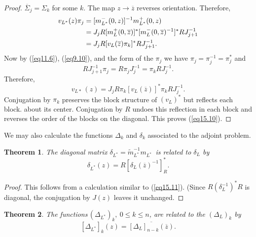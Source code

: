\documentclass{surv-l}
\theoremstyle{plain}
\newtheorem{theorem}{Theorem}[section]
\theoremstyle{definition}
\numberwithin{equation}{chapter}
\begin{document}
\begin{proof}
$\overline{\Sigma}_{j}=\Sigma_{k}$ for some $k$. The map $z\rightarrow\overline{z}$ reverses orientation. Therefore,
\begin{align}\label{eq15.11}
v_{L^{*}}(z)\pi_{j}&=[m_{L^{*}}^{-}(0, z)]^{-1}m_{L^{*}}^{+}(0,z)\\ \notag
&=J_{j}R[m_{L}^{+}(0,\overline{z})]^{*}[m_{L}^{-}(0, \overline{z})^{-1}]^{*}RJ_{j+1}^{-1}\\
&=J_{j}R[v_{L}(\overline{z})\pi_{k}]^{*}RJ_{j+1}^{-1}. \notag
\end{align}
Now by (\ref{eq11.6}), (\ref{eq9.10}), and the form of the $\pi_{j}$ we have $\pi_{j}=\pi_{j}^{-1}=\pi_{j}^{*}$ and
\begin{equation*}
RJ_{j+1}^{-1}\pi_{j}=R\pi_{j}J_{j}^{-1}=\pi_{k}RJ_{j}^{-1}.
\end{equation*}
Therefore,
\setcounter{equation}{11}
\begin{equation}\label{eq15.12}
v_{L*}\, (z)=J_{j}R\pi_{k}[v_{L}(\overline{z})]^{*}\pi_{k}RJ_{j}^{-1}.
\end{equation}
Conjugation by $\pi_{k}$ preserves the block structure of $(v_{L})^{*}$ but reflects each block. about its center. Conjugation by $R$ undoes this reflection in each block and reverses the order of the blocks on the diagonal. This proves (\ref{eq15.10}).
\end{proof}
We may also calculate the functions $\Delta_{k}$ and $\delta_{k}$ associated to the adjoint problem.
\setcounter{theorem}{12}
\begin{theorem}\label{thm15.13}
The diagonal matrix $\delta_{L^{*}}=\tilde{m}_{L^{*}}^{-1}m_{L^{*}}$\, is related to $\delta_{L}$  by
\setcounter{equation}{13}
\begin{equation}\label{eq15.14}
\delta_{L^{*}} (z)=R[\delta_{L}(\overline{z})^{-1}]_{R}^{*}.
\end{equation}
\end{theorem}

\begin{proof}
This follows from a calculation similar to (\ref{eq15.11}). (Since $R(\delta_{L}^{-1})^{*}R$ is diagonal, the conjugation by $J(z)$ leaves it unchanged.
\end{proof}
\setcounter{theorem}{14}
\begin{theorem}\label{thm15.15}
The functions\,$(\Delta_{{{L}}^{{\ast}}})_{k},\ 0\leq k\leq n$,  are related to  the $(\Delta_{L})_{k}$ by
\setcounter{equation}{15}
\begin{equation}\label{eq15.16}
[\Delta_{L^{*}}]_{k}(z)=\overline{[\Delta_{L}]_{n-k}(\overline{z})}.
\end{equation}

\end{theorem}
\end{document}
